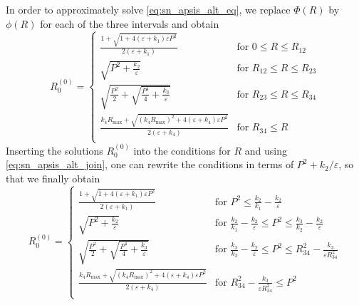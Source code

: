 In order to approximately solve \cref{eq:sn_apsis_alt_eq}, we replace $\Phi(R)$ by $\phi(R)$ for each of the three intervals and obtain
%
\begin{equation}
    \label{eq:sn_apsis_alt_sol_R_tmp}
    R_0^{(0)} =
        \begin{cases}
            \displaystyle
            \frac{ 1 + \sqrt{ 1 + 4 (\varepsilon + k_1 ) \varepsilon P^2 }}{
                2 (\varepsilon + k_1 )}
            & \text{for } 0 \le R \le R_{12} \\[10pt]
            \sqrt{ P^2 + \frac{ k_2 }{ \varepsilon} }
            & \text{for } R_{12} \le R \le R_{23} \\[10pt]
            \sqrt{ \frac{ P^2 }{ 2 } + \sqrt{ \frac{ P^4 }{ 4 } + \frac{ k_3 }{ \varepsilon }}}
            & \text{for } R_{23} \le R \le R_{34} \\[10pt]
            \displaystyle
            \frac{ k_4 R_\mathrm{max}
                   + \sqrt{ (k_4 R_\mathrm{max})^2
                             + 4 (\varepsilon + k_4 ) \varepsilon P^2 }}{
            2 (\varepsilon + k_4 )}
            &  \text{for } R_{34} \le R \\
        \end{cases}
\end{equation}
%
Inserting the solutions $R_0^{(0)}$ into the conditions for $R$ and using \cref{eq:sn_apsis_alt_join}, one can rewrite the conditions in terms of $P^2 + k_2 / \varepsilon$, so that we finally obtain
\begin{equation}
    \label{eq:sn_apsis_alt_sol_R}
    R_0^{(0)} =
    \begin{cases}
        \displaystyle
        \frac{ 1 + \sqrt{ 1 + 4 (\varepsilon + k_1 ) \varepsilon P^2 }}{
            2 (\varepsilon + k_1 )}
        & \text{for } P^2 \le \frac{ k_2 }{ k_1 } - \frac{ k_2 }{ \varepsilon } \\[10pt]
        \sqrt{ P^2 + \frac{ k_2 }{ \varepsilon} }
        & \text{for } \frac{ k_2 }{ k_1 } - \frac{ k_2 }{ \varepsilon } \le P^2
            \le \frac{ k_3 }{ k_2 } - \frac{ k_2 }{ \varepsilon } \\[10pt]
        \sqrt{ \frac{ P^2 }{ 2 } + \sqrt{ \frac{ P^4 }{ 4 } + \frac{ k_3 }{ \varepsilon }}}
        & \text{for } \frac{ k_3 }{ k_2 } - \frac{ k_2 }{ \varepsilon } \le P^2
            \le R_{34}^2 - \frac{ k_3 }{ \varepsilon R_{34}^2 }\\[10pt]
            \displaystyle
        \frac{ k_4 R_\mathrm{max}
               + \sqrt{ (k_4 R_\mathrm{max})^2
                        + 4 (\varepsilon + k_4 ) \varepsilon P^2 } }{
               2 (\varepsilon + k_4 )}
        &  \text{for } R_{34}^2 - \frac{ k_3 }{ \varepsilon R_{34}^2 } \le P^2 \\
    \end{cases}
\end{equation}

